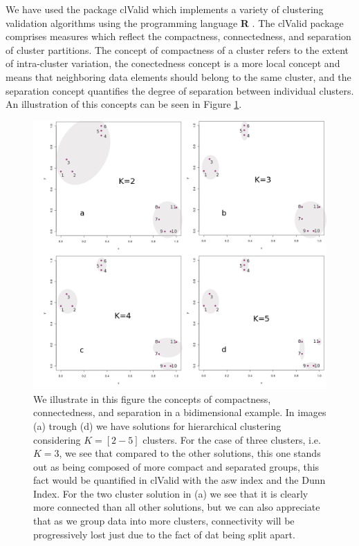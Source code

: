 We have  used the package clValid \cite{brock2008}  which implements a
variety  of  clustering validation  algorithms  using the  programming
language  \textbf{R}  \cite{rcite}.   The  clValid  package  comprises
measures which reflect  the compactness, connectedness, and separation
of cluster partitions. The concept  of compactness of a cluster refers
to the extent of  intra-cluster variation, the conectedness concept is
a more local  concept and means that neighboring  data elements should
belong to the same cluster, and the separation concept quantifies the
degree of separation between individual clusters. An illustration of
this concepts can be seen in Figure \ref{fig:concomsep}.

\begin{figure}
\centering
\includegraphics[scale=0.3]{Appendix/consilcom.png}
\caption{We  illustrate in  this figure  the concepts  of compactness,
  connectedness, and separation in a bidimensional example.  In images
  (a)  trough  (d)  we  have  solutions  for  hierarchical  clustering
  considering  $K=[2-5]$ clusters.   For the  case of  three clusters,
  i.e. $K=3$,  we see that compared  to the other  solutions, this one
  stands out as  being composed of more compact  and separated groups,
  this fact would be quantified in  clValid with the asw index and the
  Dunn Index.  For  the two cluster solution in (a) we  see that it is
  clearly more  connected than  all other solutions,  but we  can also
  appreciate that  as we group  data into more  clusters, connectivity
  will be progressively  lost just due to the fact  of dat being split
  apart.}
\label{fig:concomsep}
\end{figure}  

